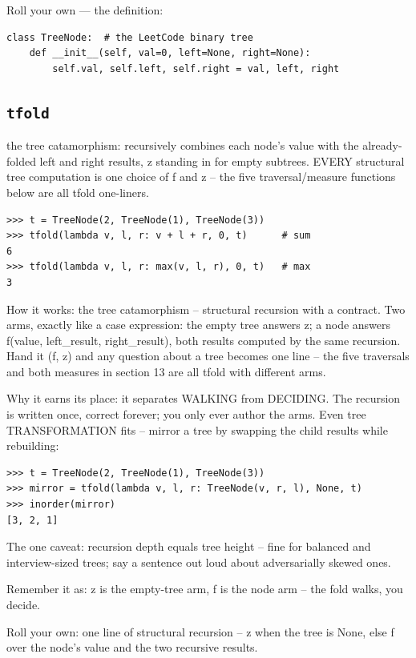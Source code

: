 \documentclass[10pt,letterpaper]{book}
\begin{document}
Roll your own --- the definition:

\begin{lstlisting}[style=ex]
class TreeNode:  # the LeetCode binary tree
    def __init__(self, val=0, left=None, right=None):
        self.val, self.left, self.right = val, left, right
\end{lstlisting}
\subsection{\texttt{tfold}}\label{def:tfold}
the tree catamorphism: recursively combines each node's value with the already-folded left and right results, z standing in for empty subtrees. EVERY structural tree computation is one choice of f and z -- the five traversal/measure functions below are all tfold one-liners.
\begin{lstlisting}[style=ex]
>>> t = TreeNode(2, TreeNode(1), TreeNode(3))
>>> tfold(lambda v, l, r: v + l + r, 0, t)      # sum
6
>>> tfold(lambda v, l, r: max(v, l, r), 0, t)   # max
3
\end{lstlisting}

How it works: the tree catamorphism -- structural recursion with a contract. Two arms, exactly like a case expression: the empty tree answers z; a node answers f(value, left\_result, right\_result), both results computed by the same recursion. Hand it (f, z) and any question about a tree becomes one line -- the five traversals and both measures in section 13 are all tfold with different arms.


Why it earns its place: it separates WALKING from DECIDING. The recursion is written once, correct forever; you only ever author the arms. Even tree TRANSFORMATION fits -- mirror a tree by swapping the child results while rebuilding:

\begin{lstlisting}[style=ex]
>>> t = TreeNode(2, TreeNode(1), TreeNode(3))
>>> mirror = tfold(lambda v, l, r: TreeNode(v, r, l), None, t)
>>> inorder(mirror)
[3, 2, 1]
\end{lstlisting}

The one caveat: recursion depth equals tree height -- fine for balanced and interview-sized trees; say a sentence out loud about adversarially skewed ones.


Remember it as: z is the empty-tree arm, f is the node arm -- the fold walks, you decide.


Roll your own: one line of structural recursion -- z when the tree is None, else f over the node's value and the two recursive results.
\end{document}

